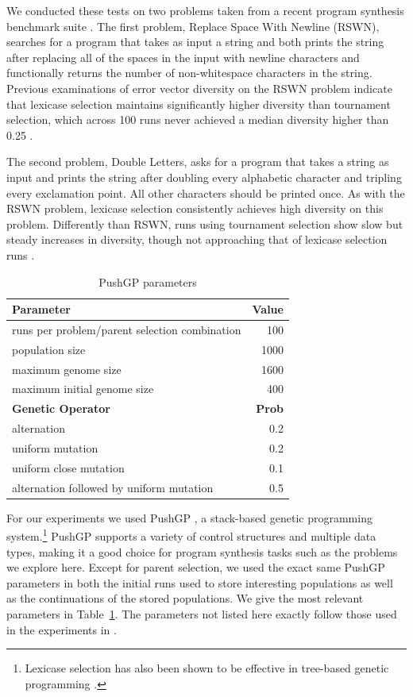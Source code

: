 \documentclass{sig-alternate-05-2015}
\begin{document}
We conducted these tests on two problems taken from a recent program synthesis benchmark suite \cite{Helmuth:2015:GECCO}. The first problem, Replace Space With Newline (RSWN), searches for a program that takes as input a string and both prints the string after replacing all of the spaces in the input with newline characters and functionally returns the number of non-whitespace characters in the string. Previous examinations of error vector diversity on the RSWN problem indicate that lexicase selection maintains significantly higher diversity than tournament selection, which across 100 runs never achieved a median diversity higher than 0.25 \cite{Helmuth:2015:GPTP}.

The second problem, Double Letters, asks for a program that takes a string as input and prints the string after doubling every alphabetic character and tripling every exclamation point. All other characters should be printed once. As with the RSWN problem, lexicase selection consistently achieves high diversity on this problem. Differently than RSWN, runs using tournament selection show slow but steady increases in diversity, though not approaching that of lexicase selection runs \cite{Helmuth:2015:GPTP}.

\begin{table}[t]
\centering
\caption{PushGP parameters}
\label{table:parameters}
\begin{tabular}{l r}
\toprule
\textbf{Parameter} & \textbf{Value} \tabularnewline
\midrule
runs per problem/parent selection combination & 100 \tabularnewline
population size & 1000 \tabularnewline
maximum genome size & 1600 \tabularnewline
maximum initial genome size & 400 \tabularnewline
\midrule
\textbf{Genetic Operator} & \textbf{Prob} \tabularnewline
\midrule
alternation & 0.2 \tabularnewline
uniform mutation & 0.2 \tabularnewline
uniform close mutation & 0.1 \tabularnewline
alternation followed by uniform mutation & 0.5 \tabularnewline
\bottomrule
\end{tabular}
\end{table}

For our experiments we used PushGP \cite{spector:2002:GPEM, 1068292}, a stack-based genetic programming system.\footnote{Lexicase selection has also been shown to be effective in tree-based genetic programming \cite{Helmuth:2015:ieeeTEC, Krawiec:2015:GECCO:smgpWorkshop}.} PushGP supports a variety of control structures and multiple data types, making it a good choice for program synthesis tasks such as the problems we explore here.
Except for parent selection, we used the exact same PushGP parameters in both the initial runs used to store interesting populations as well as the continuations of the stored populations. We give the most relevant parameters in Table~\ref{table:parameters}. The parameters not listed here exactly follow those used in the experiments in  \cite{Helmuth:2015:dissertation}.
\end{document}
